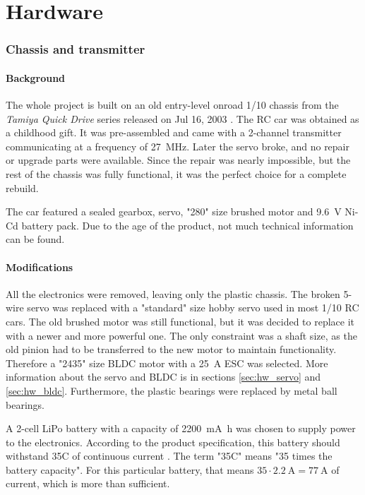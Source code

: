 


\part{Hardware}
\label{chap:hw}


\section{Chassis and transmitter}
\label{sec:hw_base}
\subsection{Background}
The whole project is built on an old entry-level onroad 1/10 chassis from the \textit{Tamiya Quick Drive} series released on Jul 16, 2003 \cite{tamiya}. The RC car was obtained as a childhood gift. It was pre-assembled and came with a 2-channel transmitter communicating at a frequency of \SI{27}{\MHz}. Later the servo broke, and no repair or upgrade parts were available. Since the repair was nearly impossible, but the rest of the chassis was fully functional, it was the perfect choice for a complete rebuild.

The car featured a sealed gearbox, servo, "280" size brushed motor and \SI{9.6}{\V} Ni-Cd battery pack. Due to the age of the product, not much technical information can be found.

\subsection{Modifications}
\label{sub:hw_mods}
All the electronics were removed, leaving only the plastic chassis. The broken 5-wire servo was replaced with a "standard" size hobby servo used in most 1/10 RC cars. The old brushed motor was still functional, but it was decided to replace it with a newer and more powerful one. The only constraint was a shaft size, as the old pinion had to be transferred to the new motor to maintain functionality. Therefore a "2435" size BLDC motor with a \SI{25}{\A} ESC was selected. More information about the servo and BLDC is in sections \ref{sec:hw_servo} and \ref{sec:hw_bldc}. Furthermore, the plastic bearings were replaced by metal ball bearings.

A 2-cell LiPo battery with a capacity of \SI{2200}{\milli\A\hour} was chosen to supply power to the electronics. According to the product specification, this battery should withstand 35C of continuous current \cite{lipo_car}. The term "35C" means "35 times the battery capacity". For this particular battery, that means $35 \cdot \SI{2.2}{\A} = \SI{77}{\A}$ of current, which is more than sufficient.

